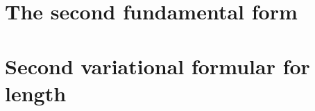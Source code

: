 \documentclass[letter-paper]{tufte-book}
\begin{document}
\section{The second fundamental form}


\section{Second variational formular for length}










\mainmatter




%


\end{document}
